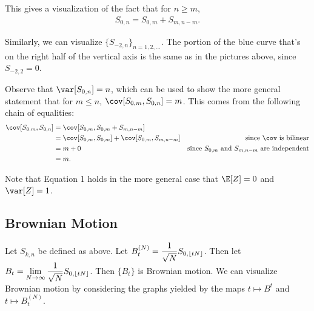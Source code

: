 This gives a visualization of the fact that for $n\geq m$, 
$$\begin{aligned}
    S_{0,n}=S_{0,m}+S_{m,n-m}.
\end{aligned}$$

Similarly, we can visualize $\{S_{-2,n}\}_{n=1,2,\dots}$.  
The portion of the blue curve that's on the right half of the vertical axis is the same as in the pictures above, since $S_{-2,2}=0$.

\begin{center}
\end{center}

Observe that $\var[S_{0,n}]=n$, which can be used to show the more general statement that for $m\leq n$, $\cov[S_{0,m},S_{0,n}]=m$.  
This comes from the following chain of equalities:
$$\begin{aligned}
\cov[S_{0.m},S_{0,n}]&=\cov[S_{0,m},S_{0,m}+S_{m,n-m}]\\
    &=\cov[S_{0,m},S_{0,m}]+\cov[S_{0,m},S_{m,n-m}]&\text{since }\cov\text{ is bilinear}\\
    &=m+0&\text{since }S_{0,m}\text{ and }S_{m,n-m}\text{ are independent}\\
    &=m.
\end{aligned}$$

Note that Equation 1 holds in the more general case that $\E[Z]=0$ and $\var[Z]=1$.

\subsection{Brownian Motion}

Let $S_{k,n}$ be defined as above.  
Let $\displaystyle B_t^{(N)}=\frac{1}{\sqrt{N}}S_{0,\lfloor tN\rfloor}$.  
Then let $\displaystyle B_t=\lim_{N\to\infty}\frac{1}{\sqrt{N}}S_{0,\lfloor tN\rfloor}$.  
Then $\{B_t\}$ is Brownian motion.  
We can visualize Brownian motion by considering the graphs yielded by the maps $t\mapsto B^t$ and $t\mapsto B_t^{(N)}$.

